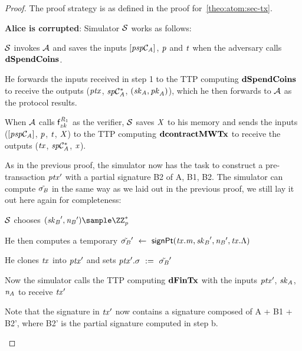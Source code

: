 \begin{proof}
    The proof strategy is as defined in the proof for~\cref{theo:atom:sec-tx}.

    \textbf{Alice is corrupted}: Simulator $\mathcal{S}$ works as follows:
    \begin{asparaenum}
        \item $\mathcal{S}$ invokes $\mathcal{A}$ and saves the inputs $[\mathit{psp}\mathcal{C}_{\mathit{A}}]$, $\mathit{p}$ and $\mathit{t}$ when the adversary calls $\mathbf{dSpendCoins}$.
        \item He forwards the inputs received in step 1 to the TTP computing $\mathbf{dSpendCoins}$ to receive the outputs ($\mathit{ptx}$, $\mathit{sp}\mathcal{C}_{\mathit{A}}^*$, $(\mathit{sk}_{\mathit{A}}, \mathit{pk}_{\mathit{A}})$), which he then forwards to $\mathcal{A}$ as the protocol results.
        \item When $\mathcal{A}$ calls $\mathsf{f}^{\mathit{R}_1}_{zk}$ as the verifier, $\mathcal{S}$ saves $\mathit{X}$ to his memory and sends the inputs ($[\mathit{psp}\mathcal{C}_{\mathit{A}}]$, $\mathit{p}$, $\mathit{t}$, $\mathit{X}$) to the TTP computing $\mathbf{dcontractMWTx}$ to receive the outputs ($\mathit{tx}$, $\mathit{sp}\mathcal{C}_{\mathit{A}}^*$, $\mathit{x}$).
        \item As in the previous proof, the simulator now has the task to construct a pre-transaction ${\mathit{ptx}}'$ with a partial signature B2 of A, B1, B2.
        The simulator can compute $\tilde{\sigma_{\mathit{B}}}$ in the same way as we laid out in the previous proof, we still lay it out here again for completeness:
        \begin{asparaenum}
            \item $\mathcal{S}$ chooses $(\funStarAlt{\varSecKeyBob}, \funStarAlt{\varNonceBob}) \sample \cnstIntegersPrimeWithoutZero{\varPrime}$
            \item He then computes a temporary ${\tilde{\sigma_{\mathit{B}}}}' ~\leftarrow~ \mathsf{signPt}(\mathit{tx}.\mathit{m}, {\mathit{sk}_{\mathit{B}}}', {\mathit{\mathit{n}_{\mathit{B}}}}', \mathit{tx}.\Lambda)$
            \item He clones $\mathit{tx}$ into ${\mathit{ptx}}'$ and sets ${\mathit{ptx}}'.\sigma ~:=~ {\tilde{\sigma_{\mathit{B}}}}'$
            \item Now the simulator calls the TTP computing $\mathbf{dFinTx}$ with the inputs ${\mathit{ptx}}'$, $\mathit{sk}_{\mathit{A}}$, $\mathit{\mathit{n}_{\mathit{A}}}$ to receive ${\mathit{tx}}'$
            \item Note that the signature in ${\mathit{tx}}'$ now contains a signature composed of A + B1 + B2', where B2' is the partial signature computed in step b.

\end{asparaenum}
\end{asparaenum}
\end{proof}
